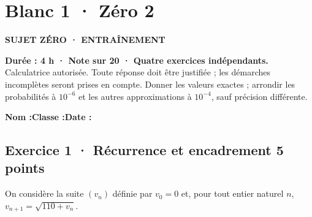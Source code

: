\fi

\clearpage{}\label{sujet:5-2}

\section*{Blanc 1 · Zéro 2}

{\sffamily\bfseries\color{teal}SUJET ZÉRO · ENTRAÎNEMENT\par}

\textbf{Durée : 4 h · Note sur 20 · Quatre exercices indépendants.}\\Calculatrice autorisée. Toute réponse doit être justifiée ; les démarches incomplètes seront prises en compte. Donner les valeurs exactes ; arrondir les probabilités à $10^{-6}$ et les autres approximations à $10^{-4}$, sauf précision différente.

\smallskip\textbf{Nom :}\enspace\dotfill\quad\textbf{Classe :}\enspace\dotfill\quad\textbf{Date :}\enspace\dotfill

\subsection*{Exercice 1 · Récurrence et encadrement \hfill 5 points}On considère la suite $(v_n)$ définie par $v_0=0$ et, pour tout entier naturel $n$, $v_{n+1}=\sqrt{110+v_n}$.


